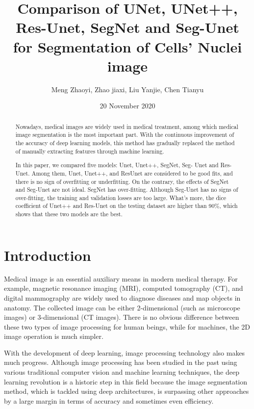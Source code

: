 \documentclass{article}
\title{Comparison of UNet, UNet++, Res-Unet, SegNet and Seg-Unet for Segmentation of Cells' Nuclei image}
\author{Meng Zhaoyi, Zhao jiaxi, Liu Yanjie, Chen Tianyu }
\date{20 November 2020}
\begin{document}
\maketitle
\setlength{\parindent}{2em}


\newpage
\tableofcontents
\newpage

\begin{abstract}
    Nowadays, medical images are widely used in medical treatment, among which medical image segmentation is the most important part. With the continuous improvement of the accuracy of deep learning models, this method has gradually replaced the method of manually extracting features through machine learning.

    In this paper, we compared five models: Unet, Unet++, SegNet, Seg- Unet and Res-Unet. Among them, Unet, Unet++, and ResUnet are considered to be good fits, and there is no sign of overfitting or underfitting. On the contrary, the effects of SegNet and Seg-Unet are not ideal. SegNet has over-fitting. Although Seg-Unet has no signs of over-fitting, the training and validation losses are too large. What’s more, the dice coefficient of Unet++ and Res-Unet on the testing dataset are higher than 90\%, which shows that these two models are the best.

\end{abstract}

\section{Introduction}

Medical image is an essential auxiliary means in modern medical therapy.
For example, magnetic resonance imaging (MRI), computed tomography (CT), and digital mammography are widely used to diagnose diseases and map objects in anatomy.\cite{pham2000current}
The collected image can be either 2-dimensional (such as microscope images) or 3-dimensional (CT images).
There is no obvious difference between these two types of image processing for human beings, while for machines, the 2D image operation is much simpler.

With the development of deep learning, image processing technology also makes much progress.
Although image processing has been studied in the past using various traditional computer vision and machine learning techniques, the deep learning revolution is a historic step in this field because the image segmentation method, which is tackled using deep architectures, is surpassing other approaches by a large margin in terms of accuracy and sometimes even efficiency.\cite{DBLP:journals/corr/Garcia-GarciaOO17}
\end{document}
